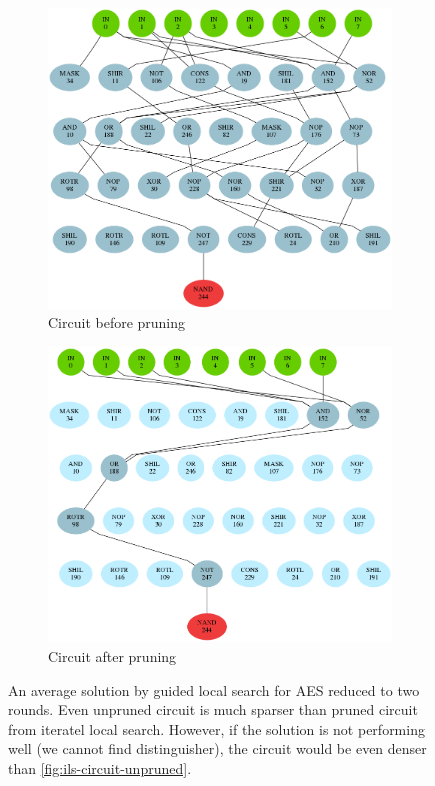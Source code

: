 \documentclass[
  print, %
  Table,   %
  nolof,     %
  nolot,     %
  11pt, %
  oneside  %
]{fithesis3}
\begin{document}
\begin{figure}
\begin{changemargin}{-3cm}{-3cm}
\centering
\begin{subfigure}{.6\textwidth}
  \centering
  \includegraphics[width=.98\textwidth]{./graphics/gls/circuit.png}
  \caption{Circuit before pruning}
  \label{fig:gls-circuit-unpruned}
\end{subfigure}%
\begin{subfigure}{.6\textwidth}
  \centering
  \includegraphics[width=.98\textwidth]{./graphics/gls/pruned.png}
  \caption{Circuit after pruning}
  \label{fig:gls-circuit-pruned}
\end{subfigure}
\end{changemargin}
\caption{An average solution by guided local search for AES reduced to two rounds. Even unpruned circuit is much sparser than pruned circuit from iteratel local search. However, if the solution is not performing well (we cannot find distinguisher), the circuit would be even denser than \cref{fig:ils-circuit-unpruned}.}
\label{fig:gls-circuits}
\end{figure}
\end{document}
